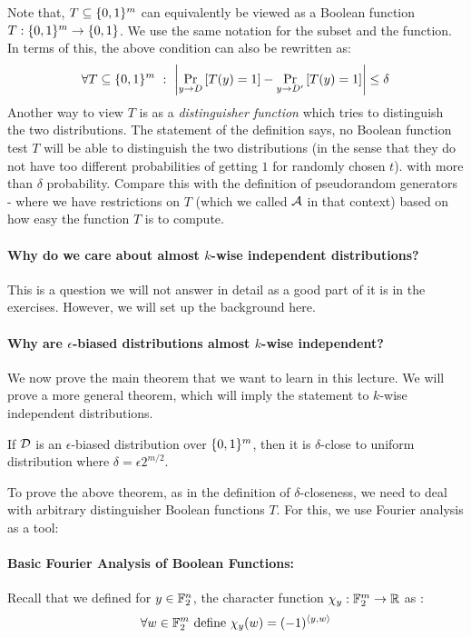 Note that, $T \subseteq \{0,1\}^m$ can equivalently be viewed as a Boolean function $T : \{0,1\}^m \to \{0,1\}$. We use the same notation for the subset and the function. In terms of this, the above condition can also be rewritten as: 
$$ \forall T \subseteq \{0,1\}^m~:~ \left| \Pr_{y \to D} \left[ T(y) = 1 \right] - \Pr_{y \to D'} \left[ T(y) = 1 \right] \right| \le \delta $$
Another way to view $T$ is as a \textit{distinguisher function} which tries to distinguish the two distributions. The statement of the definition says, no Boolean function test $T$ will be able to distinguish the two distributions (in the sense that they do not have too different probabilities of getting $1$ for randomly chosen $t$). with more than $\delta$ probability. Compare this with the definition of pseudorandom generators - where we have restrictions on $T$ (which we called ${\cal A}$ in that context) based on how easy the function $T$ is to compute.

\paragraph{\bf Why do we care about almost $k$-wise independent distributions?} This is a question we will not answer in detail as a good part of it is in the exercises. However, we will set up the background here.

\paragraph{\bf Why are $\epsilon$-biased distributions almost $k$-wise independent?}
We now prove the main theorem that we want to learn in this lecture. We will prove a more general theorem, which will imply the statement to $k$-wise independent distributions. 

\begin{theorem}
If ${\cal D}$ is an $\epsilon$-biased distribution over $\{0,1\}^m$, then it is $\delta$-close to uniform distribution where $\delta = \epsilon 2^{m/2}$.
\end{theorem}
To prove the above theorem, as in the definition of $\delta$-closeness, we need to deal with arbitrary distinguisher Boolean functions $T$. For this, we use Fourier analysis as a tool:

\paragraph{\bf Basic Fourier Analysis of Boolean Functions:}

Recall that we defined for $y \in {\mathbb{F}}_2^n$, the character function 
$\chi_y : {\mathbb{F}}_2^m \to \mathbb{R}$ as : 
$$\forall w \in {\mathbb{F}}_2^m \textrm{ define } \chi_y(w) = (-1)^{\langle y,w \rangle}$$

